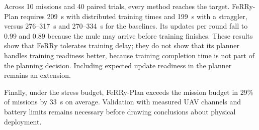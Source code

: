 \documentclass[conference]{IEEEtran}
\newcommand{\sysname}{FeRRy}
\begin{document}
Across 10 missions and 40 paired trials, every method reaches the target.
\sysname{}-Plan requires 209~s with distributed training times and 199~s with
a straggler, versus 276--317~s and 270--334~s for the baselines. Its updates
per round fall to 0.99 and 0.89 because the mule may arrive before training
finishes. These results show that \sysname{} tolerates training delay; they do
not show that its planner handles training readiness better, because training
completion time is not part of the planning decision. Including expected update
readiness in the planner remains an extension.

Finally, under the stress budget, \sysname{}-Plan exceeds the mission budget in
29\% of missions by 33~s on average. Validation with measured UAV channels and
battery limits remains necessary before drawing conclusions about physical
deployment.
\end{document}
